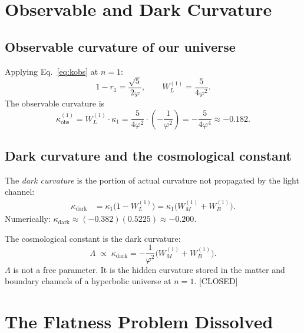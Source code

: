 \documentclass[prd,twocolumn,preprintnumbers,amsmath,amssymb]{revtex4-2}
\newcommand{\closed}{\textcolor{green!60!black}{[CLOSED]}}
\newcommand{\phig}{\varphi}
\newcommand{\WL}{W_{L}}
\newcommand{\WB}{W_{B}}
\newcommand{\WM}{W_{M}}
\newcommand{\kobs}{\kappa_{\mathrm{obs}}}
\newcommand{\kdark}{\kappa_{\mathrm{dark}}}
\begin{document}
\section{Observable and Dark Curvature}
\label{sec:dark}

\subsection{Observable curvature of our universe}

Applying Eq.~\eqref{eq:kobs} at $n=1$:
\begin{equation}
  1 - r_1 = \frac{\sqrt{5}}{2\phig},
  \qquad
  \WL^{(1)} = \frac{5}{4\phig^2}.
  \label{eq:WL1}
\end{equation}
The observable curvature is
\begin{equation}
  \kobs^{(1)} = \WL^{(1)}\cdot\kappa_1
              = \frac{5}{4\phig^2}\cdot\left(-\frac{1}{\phig^2}\right)
              = -\frac{5}{4\phig^4} \approx -0.182.
  \label{eq:kobs1}
\end{equation}

\subsection{Dark curvature and the cosmological constant}

The \emph{dark curvature} is the portion of actual curvature not propagated
by the light channel:
\begin{align}
  \kdark &= \kappa_1\bigl(1 - \WL^{(1)}\bigr)
          = \kappa_1\bigl(\WM^{(1)} + \WB^{(1)}\bigr).
  \label{eq:kdark}
\end{align}
Numerically: $\kdark \approx (-0.382)(0.5225) \approx -0.200$.

The cosmological constant is the dark curvature:
\begin{equation}
  \Lambda \;\propto\; \kdark = -\frac{1}{\phig^2}\bigl(\WM^{(1)}+\WB^{(1)}\bigr).
  \label{eq:Lambda}
\end{equation}
$\Lambda$ is not a free parameter.  It is the hidden curvature stored in the
matter and boundary channels of a hyperbolic universe at $n=1$.  \closed

\section{The Flatness Problem Dissolved}
\label{sec:flatness}
\end{document}
